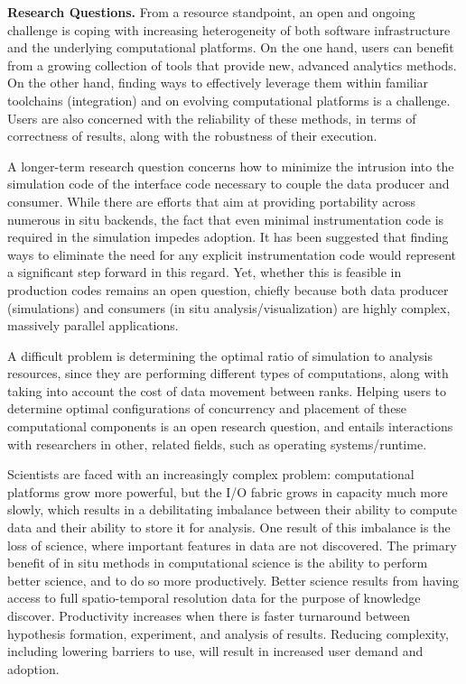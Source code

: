 \begin{refsection}
\medskip\noindent
\textbf{\sffamily Research Questions.} 
From a resource standpoint, an open and ongoing challenge is coping with increasing heterogeneity of both software infrastructure and the underlying computational platforms. 
On the one hand, users can benefit from a growing collection of tools that provide new, advanced analytics methods. 
On the other hand, finding ways to effectively leverage them within familiar toolchains (integration) and on evolving computational platforms is a challenge. 
Users are also concerned with the reliability of these methods, in terms of correctness of results, along with the robustness of their execution.

A longer-term research question concerns how to minimize the intrusion into the simulation code of the interface code necessary to couple the data producer and consumer. 
While there are efforts that aim at providing portability across numerous in situ backends, the fact that even minimal instrumentation code is required in the simulation impedes adoption. 
It has been suggested that finding ways to eliminate the need for any explicit instrumentation code would represent a significant step forward in this regard. 
Yet, whether this is feasible in production codes remains an open question, chiefly because both data producer (simulations) and consumers (in situ analysis/visualization) are highly complex, massively parallel applications. 

A difficult problem is determining the optimal ratio of simulation to analysis resources, since they are performing different types of computations, along with taking into account the cost of data movement between ranks. 
Helping users to determine optimal configurations of concurrency and placement of these computational components is an open research question, and entails interactions with researchers in other, related fields, such as operating systems/runtime.

Scientists are faced with an increasingly complex problem: computational platforms grow more powerful, but the I/O fabric grows in capacity much more slowly, which results in a debilitating imbalance between their ability to compute data and their ability to store it for analysis. 
One result of this imbalance is the loss of science, where important features in data are not discovered. 
The primary benefit of in situ methods in computational science is the ability to perform better science, and to do so more productively. 
Better science results from having access to full spatio-temporal resolution data for the purpose of knowledge discover. 
Productivity increases when there is faster turnaround between hypothesis formation, experiment, and analysis of results. 
Reducing complexity, including lowering barriers to use, will result in increased user demand and adoption. 


\end{refsection}
